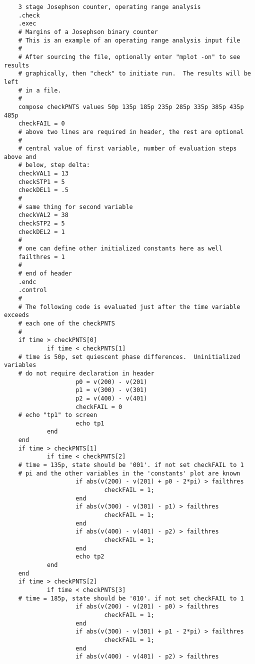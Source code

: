 \begin{verbatim}
    3 stage Josephson counter, operating range analysis
    .check
    .exec
    # Margins of a Josephson binary counter
    # This is an example of an operating range analysis input file
    #
    # After sourcing the file, optionally enter "mplot -on" to see results
    # graphically, then "check" to initiate run.  The results will be left
    # in a file.
    #
    compose checkPNTS values 50p 135p 185p 235p 285p 335p 385p 435p 485p
    checkFAIL = 0
    # above two lines are required in header, the rest are optional
    #
    # central value of first variable, number of evaluation steps above and
    # below, step delta:
    checkVAL1 = 13
    checkSTP1 = 5
    checkDEL1 = .5
    #
    # same thing for second variable
    checkVAL2 = 38
    checkSTP2 = 5
    checkDEL2 = 1
    #
    # one can define other initialized constants here as well
    failthres = 1
    #
    # end of header
    .endc
    .control
    #
    # The following code is evaluated just after the time variable exceeds
    # each one of the checkPNTS
    #
    if time > checkPNTS[0]
            if time < checkPNTS[1]
    # time is 50p, set quiescent phase differences.  Uninitialized variables
    # do not require declaration in header
                    p0 = v(200) - v(201)
                    p1 = v(300) - v(301)
                    p2 = v(400) - v(401)
                    checkFAIL = 0
    # echo "tp1" to screen
                    echo tp1
            end
    end
    if time > checkPNTS[1]
            if time < checkPNTS[2]
    # time = 135p, state should be '001'. if not set checkFAIL to 1
    # pi and the other variables in the 'constants' plot are known
                    if abs(v(200) - v(201) + p0 - 2*pi) > failthres
                            checkFAIL = 1;
                    end
                    if abs(v(300) - v(301) - p1) > failthres
                            checkFAIL = 1;
                    end
                    if abs(v(400) - v(401) - p2) > failthres
                            checkFAIL = 1;
                    end
                    echo tp2
            end
    end
    if time > checkPNTS[2]
            if time < checkPNTS[3]
    # time = 185p, state should be '010'. if not set checkFAIL to 1
                    if abs(v(200) - v(201) - p0) > failthres
                            checkFAIL = 1;
                    end
                    if abs(v(300) - v(301) + p1 - 2*pi) > failthres
                            checkFAIL = 1;
                    end
                    if abs(v(400) - v(401) - p2) > failthres

\end{verbatim}
